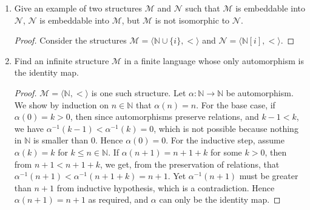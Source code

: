 \documentclass{article}
\begin{document}
\begin{enumerate}
\begin{enumerate}
      \item $\mathcal{M}=\langle\mathbb{N}\setminus\{0\},\cdot,1\rangle$ and
        $\mathcal{N}=\langle\mathbb{N},+,0\rangle$
        \begin{proof}
          No such embedding exists. Assume that an embedding
          $\alpha:\mathbb{N}\hookrightarrow\mathbb{N}$ exists. Since
          embeddings preserve function maps, we can prove by induction on
          $k$ that for any $n\in\mathbb{N}\setminus\{0\}$,
          $\alpha(n^k)=k\cdot \alpha(n)$.  Let $m=\alpha(2)$ and
          $n=\alpha(3)$. Note that $m\neq0$ and $n\neq0$ since
          $\alpha(1)=0$ and $\alpha$ is injective. Then $\alpha(2^n)=n\cdot
          m=m\cdot n=\alpha(3^m)$, yet $2^n\neq3^m$ since $m,n\neq0$,
          contradicting the injectiveness of $\alpha$.
        \end{proof}
    \end{enumerate}

  \item Give an example of two structures $\mathcal{M}$ and $\mathcal{N}$
    such that $\mathcal{M}$ is embeddable into $\mathcal{N}$, $\mathcal{N}$
    is embeddable into $\mathcal{M}$, but $\mathcal{M}$ is not isomorphic
    to $\mathcal{N}$.

    \begin{proof}
      Consider the structures
      $\mathcal{M}=\langle\mathbb{N}\cup\{i\},<\rangle$ and
      $\mathcal{N}=\langle\mathbb{N}[i],<\rangle$.
    \end{proof}

  \item Find an infinite structure $\mathcal{M}$ in a finite language whose
    only automorphism is the identity map.

    \begin{proof}
      $\mathcal{M}=\langle\mathbb{N},<\rangle$ is one such structure. Let
      $\alpha:\mathbb{N}\rightarrow\mathbb{N}$ be automorphism. We show by
      induction on $n\in\mathbb{N}$ that $\alpha(n)=n$. For the base case,
      if $\alpha(0)=k>0$, then since automorphisms preserve relations, and
      $k-1<k$, we have $\alpha^{-1}(k-1)<\alpha^{-1}(k)=0$, which is not
      possible because nothing in $\mathbb{N}$ is smaller than $0$. Hence
      $\alpha(0)=0$. For the inductive step, assume $\alpha(k)=k$ for
      $k\leq n\in\mathbb{N}$. If $\alpha(n+1)=n+1+k$ for some $k>0$, then
      from $n+1<n+1+k$, we get, from the preservation of relations, that
      $\alpha^{-1}(n+1)<\alpha^{-1}(n+1+k)=n+1$. Yet $\alpha^{-1}(n+1)$
      must be greater than $n+1$ from inductive hypothesis, which is a
      contradiction. Hence $\alpha(n+1)=n+1$ as required, and $\alpha$ can
      only be the identity map.
    \end{proof}


\end{enumerate}
\end{document}
